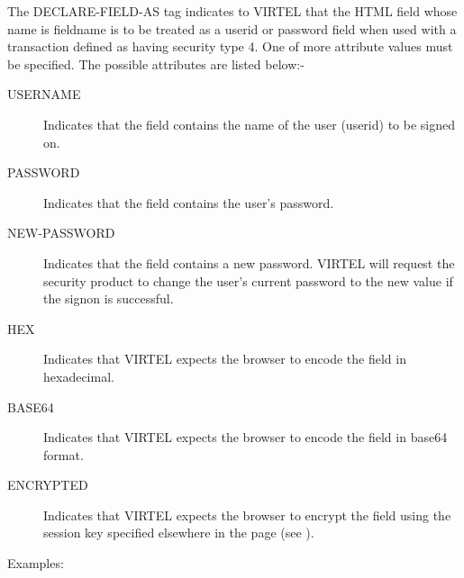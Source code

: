 \documentclass[letterpaper,10pt,english]{sphinxmanual}
\begin{document}
The DECLARE-FIELD-AS tag indicates to VIRTEL that the HTML field whose name is fieldname is to be treated as a userid or password field when used with a transaction defined as having security type 4. One of more attribute values must be specified. The possible attributes are listed below:-
\begin{description}
\item[{USERNAME}] \leavevmode
Indicates that the field contains the name of the user (userid) to be signed on.

\item[{PASSWORD}] \leavevmode
Indicates that the field contains the user’s password.

\item[{NEW-PASSWORD}] \leavevmode
Indicates that the field contains a new password. VIRTEL will request the security product to change the user’s current password to the new value if the signon is successful.

\item[{HEX}] \leavevmode
Indicates that VIRTEL expects the browser to encode the field in hexadecimal.

\item[{BASE64}] \leavevmode
Indicates that VIRTEL expects the browser to encode the field in base64 format.

\item[{ENCRYPTED}] \leavevmode
Indicates that VIRTEL expects the browser to encrypt the field using the session key specified elsewhere in the page (see {\hyperref[\detokenize{User_Guide:v457ug-declare-field-crypto}]{}}).

\end{description}

Examples:

\begin{sphinxVerbatim}[commandchars=\\\{\}]
   
   
   
\end{sphinxVerbatim}
\end{document}
